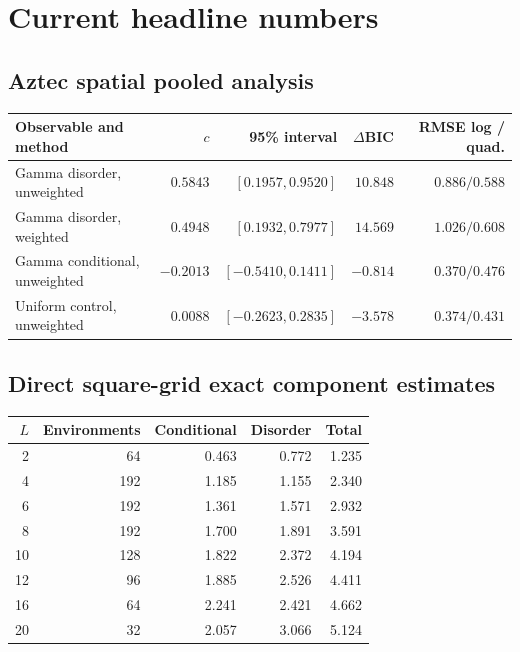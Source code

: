 \documentclass[11pt,a4paper,oneside,openany]{memoir}
\newcommand{\1}{\bm{1}}
\begin{document}
\appendix

\chapter{Current headline numbers}

\section{Aztec spatial pooled analysis}

\begin{center}
\begin{tabular}{lrrrr}
\toprule
\textbf{Observable and method} & $c$ & \textbf{95\% interval} & $\Delta$BIC & \textbf{RMSE log / quad.}\\
\midrule
Gamma disorder, unweighted & $0.5843$ & $[0.1957,0.9520]$ & $10.848$ & $0.886/0.588$\\
Gamma disorder, weighted & $0.4948$ & $[0.1932,0.7977]$ & $14.569$ & $1.026/0.608$\\
Gamma conditional, unweighted & $-0.2013$ & $[-0.5410,0.1411]$ & $-0.814$ & $0.370/0.476$\\
Uniform control, unweighted & $0.0088$ & $[-0.2623,0.2835]$ & $-3.578$ & $0.374/0.431$\\
\bottomrule
\end{tabular}
\end{center}

\section{Direct square-grid exact component estimates}

\begin{center}
\begin{tabular}{rrrrr}
\toprule
$L$ & \textbf{Environments} & \textbf{Conditional} & \textbf{Disorder} & \textbf{Total}\\
\midrule
2 & 64 & 0.463 & 0.772 & 1.235\\
4 & 192 & 1.185 & 1.155 & 2.340\\
6 & 192 & 1.361 & 1.571 & 2.932\\
8 & 192 & 1.700 & 1.891 & 3.591\\
10 & 128 & 1.822 & 2.372 & 4.194\\
12 & 96 & 1.885 & 2.526 & 4.411\\
16 & 64 & 2.241 & 2.421 & 4.662\\
20 & 32 & 2.057 & 3.066 & 5.124\\
\bottomrule
\end{tabular}
\end{center}
\end{document}
